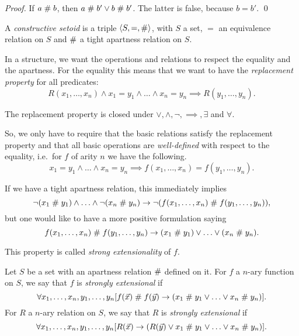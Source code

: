 \begin{proof}
  If $a\mathrel{\#} b$, then $a\mathrel{\#} b' \vee b\mathrel{\#} b'$. The latter is false,
  because $b=b'$. \qed
\end{proof}

\begin{definition}\label{defset} A {\em constructive setoid\/} is a triple 
 $\langle  S, =, \mathrel{\#} \rangle$, with  $S$ a set, $=$ an equivalence relation
 on $S$ and $\mathrel{\#}$ a tight apartness relation on $S$.
\end{definition}

In a structure, we want the operations and relations to respect
the equality and the apartness. For the equality this means
that we want to have the {\em replacement property\/} for all
predicates:
$$R(x_1,\ldots , x_n)\wedge x_1 = y_1 \wedge \ldots \wedge x_n = y_n
\implies R(y_1,\ldots , y_n).$$ 

\begin{fact}
The replacement property is closed under $\vee, \wedge, \neg,
\implies, \exists$ and $\forall$.
\end{fact}

So, we only have to require that the basic relations satisfy the
replacement property and that all basic operations are {\em
well-defined\/} with respect to the equality, i.e.\ for $f$ of arity
$n$ we have the following.
$$x_1 = y_1 \wedge \ldots \wedge x_n = y_n
\implies f(x_1,\ldots , x_n) = f(y_1,\ldots , y_n).$$ 

If we have a tight apartness relation, 
this immediately implies
$$\neg(x_1 \mathrel{\#} y_1) \wedge \ldots \wedge \neg(x_n \mathrel{\#} y_n)
\rightarrow \neg(f(x_1,\ldots , x_n) \mathrel{\#} f(y_1,\ldots , y_n)),$$
but one would like to have a more positive
formulation saying
$$f(x_1,\ldots , x_n) \mathrel{\#} f(y_1,\ldots , y_n)\rightarrow (x_1 \mathrel{\#}
y_1) \vee \ldots \vee (x_n \mathrel{\#} y_n).$$  

This property is called {\em strong extensionality\/} of $f$.

\begin{definition}\label{defstrext}
Let $S$ be a set with an apartness relation $\mathrel{\#}$ defined on it. For
$f$ a $n$-ary function on $S$, we say that $f$ is {\em strongly
extensional\/} if
$$\forall x_1, \ldots, x_n, y_1, \ldots, y_n [f(\vec{x}) \mathrel{\#}
f(\vec{y}) \rightarrow (x_1\mathrel{\#} y_1 \vee \ldots \vee x_n \mathrel{\#} y_n)].$$
For $R$ a $n$-ary relation on $S$, we say that $R$ is {\em strongly
extensional\/} if
$$\forall x_1, \ldots, x_n, y_1, \ldots, y_n [R(\vec{x}) \rightarrow 
(R(\vec{y})
\vee x_1\mathrel{\#} y_1 \vee \ldots \vee x_n \mathrel{\#} y_n)].$$
\end{definition}

